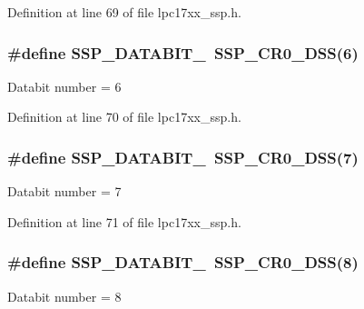 \-Definition at line 69 of file lpc17xx\-\_\-ssp.\-h.

\hypertarget{group___s_s_p___public___macros_gaab15bd61146f368a6eae98cb47586aa9}{
\subsubsection[{\-S\-S\-P\-\_\-\-D\-A\-T\-A\-B\-I\-T\-\_\-6}]{\setlength{\rightskip}{0pt plus 5cm}\#define {\bf \-S\-S\-P\-\_\-\-D\-A\-T\-A\-B\-I\-T\-\_}~{\bf \-S\-S\-P\-\_\-\-C\-R0\-\_\-\-D\-S\-S}(6)}}\label{group___s_s_p___public___macros_gaab15bd61146f368a6eae98cb47586aa9}
\-Databit number = 6 

\-Definition at line 70 of file lpc17xx\-\_\-ssp.\-h.

\hypertarget{group___s_s_p___public___macros_ga22e347ea7a0a898ff97b6ca200aa5cd0}{
\subsubsection[{\-S\-S\-P\-\_\-\-D\-A\-T\-A\-B\-I\-T\-\_\-7}]{\setlength{\rightskip}{0pt plus 5cm}\#define {\bf \-S\-S\-P\-\_\-\-D\-A\-T\-A\-B\-I\-T\-\_}~{\bf \-S\-S\-P\-\_\-\-C\-R0\-\_\-\-D\-S\-S}(7)}}\label{group___s_s_p___public___macros_ga22e347ea7a0a898ff97b6ca200aa5cd0}
\-Databit number = 7 

\-Definition at line 71 of file lpc17xx\-\_\-ssp.\-h.

\hypertarget{group___s_s_p___public___macros_gad5351b3c8a625149e6ff44bf96c0c71b}{
\subsubsection[{\-S\-S\-P\-\_\-\-D\-A\-T\-A\-B\-I\-T\-\_\-8}]{\setlength{\rightskip}{0pt plus 5cm}\#define {\bf \-S\-S\-P\-\_\-\-D\-A\-T\-A\-B\-I\-T\-\_}~{\bf \-S\-S\-P\-\_\-\-C\-R0\-\_\-\-D\-S\-S}(8)}}\label{group___s_s_p___public___macros_gad5351b3c8a625149e6ff44bf96c0c71b}
\-Databit number = 8 

